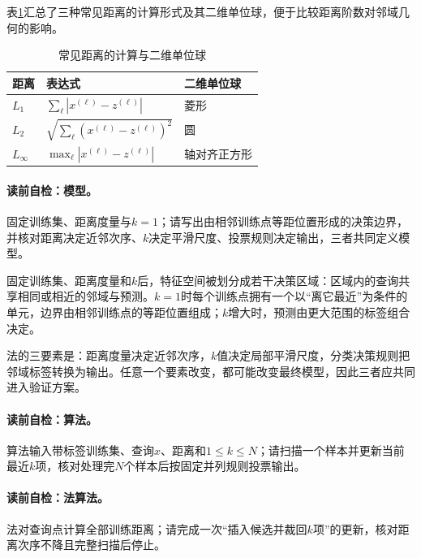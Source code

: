 表\ref{tab:V2-C02-distances}汇总了三种常见距离的计算形式及其二维单位球，便于比较距离阶数对邻域几何的影响。

\begin{table}[htbp]
\centering
\caption{常见距离的计算与二维单位球}\label{tab:V2-C02-distances}
\begin{tabular}{@{}lll@{}}
\toprule 距离 & 表达式 & 二维单位球\\ \midrule
$L_1$ & $\sum_\ell|x^{(\ell)}-z^{(\ell)}|$ & 菱形\\
$L_2$ & $\sqrt{\sum_\ell(x^{(\ell)}-z^{(\ell)})^2}$ & 圆\\
$L_\infty$ & $\max_\ell|x^{(\ell)}-z^{(\ell)}|$ & 轴对齐正方形\\
\bottomrule
\end{tabular}
\end{table}


\paragraph{读前自检：\kNN{}模型。}固定训练集、距离度量与$k=1$；请写出由相邻训练点等距位置形成的决策边界，并核对距离决定近邻次序、$k$决定平滑尺度、投票规则决定输出，三者共同定义\kNN{}模型。\par

\label{struct:V2-C02-CH08}
固定训练集、距离度量和$k$后，特征空间被划分成若干决策区域：区域内的查询共享相同或相近的邻域与预测。$k=1$时每个训练点拥有一个以“离它最近”为条件的单元，边界由相邻训练点的等距位置组成；$k$增大时，预测由更大范围的标签组合决定。

\kNN{}法的三要素是：距离度量决定近邻次序，$k$值决定局部平滑尺度，分类决策规则把邻域标签转换为输出。任意一个要素改变，都可能改变最终模型，因此三者应共同进入验证方案。

\paragraph{读前自检：\kNN{}算法。}\kNN{}算法输入带标签训练集、查询$x$、距离和$1\le k\le N$；请扫描一个样本并更新当前最近$k$项，核对处理完$N$个样本后按固定并列规则投票输出。\par
\paragraph{读前自检：\kNN{}法算法。}\kNN{}法对查询点计算全部训练距离；请完成一次“插入候选并裁回$k$项”的更新，核对距离次序不降且完整扫描后停止。\par

